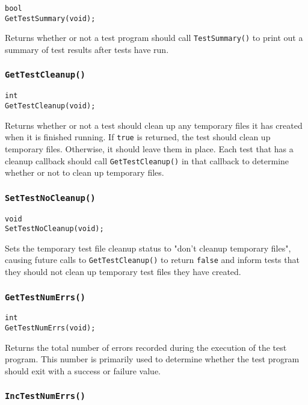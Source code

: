 \documentclass[../HDF5_RFC.tex]{subfiles}
\begin{document}
\begin{verbatim}
bool
GetTestSummary(void);
\end{verbatim}

Returns whether or not a test program should call \texttt{TestSummary()} to print out a summary of
test results after tests have run.

\subsubsection{\texttt{GetTestCleanup()}}
\label{apdx:testframe_gettestcleanup}

\begin{verbatim}
int
GetTestCleanup(void);
\end{verbatim}

Returns whether or not a test should clean up any temporary files it has created when it is finished
running. If \texttt{true} is returned, the test should clean up temporary files. Otherwise, it should
leave them in place. Each test that has a cleanup callback should call \texttt{GetTestCleanup()} in
that callback to determine whether or not to clean up temporary files.

\subsubsection{\texttt{SetTestNoCleanup()}}

\begin{verbatim}
void
SetTestNoCleanup(void);
\end{verbatim}

Sets the temporary test file cleanup status to "don't cleanup temporary files", causing future calls to \texttt{GetTestCleanup()} to return \texttt{false} and inform tests that they should not clean up temporary test files they have created.

\subsubsection{\texttt{GetTestNumErrs()}}

\begin{verbatim}
int
GetTestNumErrs(void);
\end{verbatim}

Returns the total number of errors recorded during the execution of the test program. This number is
primarily used to determine whether the test program should exit with a success or failure value.

\subsubsection{\texttt{IncTestNumErrs()}}
\end{document}
